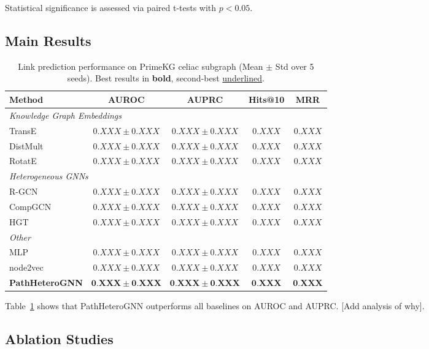 \documentclass[twoside]{article}
\begin{document}
Statistical significance is assessed via paired t-tests with $p < 0.05$.

\subsection{Main Results}

\begin{table}[t]
\centering
\caption{Link prediction performance on PrimeKG celiac subgraph (Mean $\pm$ Std over 5 seeds). Best results in \textbf{bold}, second-best \underline{underlined}.}
\label{tab:main_results}
\begin{tabular}{lcccc}
\toprule
\textbf{Method} & \textbf{AUROC} & \textbf{AUPRC} & \textbf{Hits@10} & \textbf{MRR} \\
\midrule
\multicolumn{5}{l}{\textit{Knowledge Graph Embeddings}} \\
TransE & $0.XXX \pm 0.XXX$ & $0.XXX \pm 0.XXX$ & $0.XXX$ & $0.XXX$ \\
DistMult & $0.XXX \pm 0.XXX$ & $0.XXX \pm 0.XXX$ & $0.XXX$ & $0.XXX$ \\
RotatE & $0.XXX \pm 0.XXX$ & $0.XXX \pm 0.XXX$ & $0.XXX$ & $0.XXX$ \\
\midrule
\multicolumn{5}{l}{\textit{Heterogeneous GNNs}} \\
R-GCN & $0.XXX \pm 0.XXX$ & $0.XXX \pm 0.XXX$ & $0.XXX$ & $0.XXX$ \\
CompGCN & $0.XXX \pm 0.XXX$ & $0.XXX \pm 0.XXX$ & $0.XXX$ & $0.XXX$ \\
HGT & $0.XXX \pm 0.XXX$ & $0.XXX \pm 0.XXX$ & $0.XXX$ & $0.XXX$ \\
\midrule
\multicolumn{5}{l}{\textit{Other}} \\
MLP & $0.XXX \pm 0.XXX$ & $0.XXX \pm 0.XXX$ & $0.XXX$ & $0.XXX$ \\
node2vec & $0.XXX \pm 0.XXX$ & $0.XXX \pm 0.XXX$ & $0.XXX$ & $0.XXX$ \\
\midrule
\textbf{PathHeteroGNN} & $\mathbf{0.XXX \pm 0.XXX}$ & $\mathbf{0.XXX \pm 0.XXX}$ & $\mathbf{0.XXX}$ & $\mathbf{0.XXX}$ \\
\bottomrule
\end{tabular}
\end{table}

Table~\ref{tab:main_results} shows that PathHeteroGNN outperforms all baselines on AUROC and AUPRC. [Add analysis of why].

\subsection{Ablation Studies}
\end{document}
